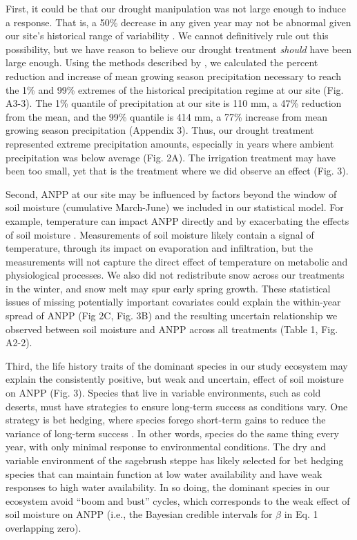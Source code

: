 \documentclass[fleqn,10pt,lineno]{wlpeerj} %
\begin{document}
First, it could be that our drought manipulation was not large enough to
induce a response. That is, a 50\% decrease in any given year may not be
abnormal given our site's historical range of variability
\citep{Knapp2017}. We cannot definitively rule out this possibility, but
we have reason to believe our drought treatment \emph{should} have been
large enough. Using the methods described by \citet{Lemoine2016}, we
calculated the percent reduction and increase of mean growing season
precipitation necessary to reach the 1\% and 99\% extremes of the
historical precipitation regime at our site (Fig. A3-3). The 1\%
quantile of precipitation at our site is 110 mm, a 47\% reduction from
the mean, and the 99\% quantile is 414 mm, a 77\% increase from mean
growing season precipitation (Appendix 3). Thus, our drought treatment
represented extreme precipitation amounts, especially in years where
ambient precipitation was below average (Fig. 2A). The irrigation
treatment may have been too small, yet that is the treatment where we
did observe an effect (Fig. 3).

Second, ANPP at our site may be influenced by factors beyond the window
of soil moisture (cumulative March-June) we included in our statistical
model. For example, temperature can impact ANPP directly
\citep{Epstein1997} and by exacerbating the effects of soil moisture
\citep{DeBoeck2011}. Measurements of soil moisture likely contain a
signal of temperature, through its impact on evaporation and
infiltration, but the measurements will not capture the direct effect of
temperature on metabolic and physiological processes. We also did not
redistribute snow across our treatments in the winter, and snow melt may
spur early spring growth. These statistical issues of missing
potentially important covariates could explain the within-year spread of
ANPP (Fig 2C, Fig. 3B) and the resulting uncertain relationship we
observed between soil moisture and ANPP across all treatments (Table 1,
Fig. A2-2).

Third, the life history traits of the dominant species in our study
ecosystem may explain the consistently positive, but weak and uncertain,
effect of soil moisture on ANPP (Fig. 3). Species that live in variable
environments, such as cold deserts, must have strategies to ensure
long-term success as conditions vary. One strategy is bet hedging, where
species forego short-term gains to reduce the variance of long-term
success \citep{Seger1987}. In other words, species do the same thing
every year, with only minimal response to environmental conditions. The
dry and variable environment of the sagebrush steppe has likely selected
for bet hedging species that can maintain function at low water
availability and have weak responses to high water availability. In so
doing, the dominant species in our ecosystem avoid ``boom and bust''
cycles, which corresponds to the weak effect of soil moisture on ANPP
(i.e., the Bayesian credible intervals for \(\beta\) in Eq. 1
overlapping zero).
\end{document}
